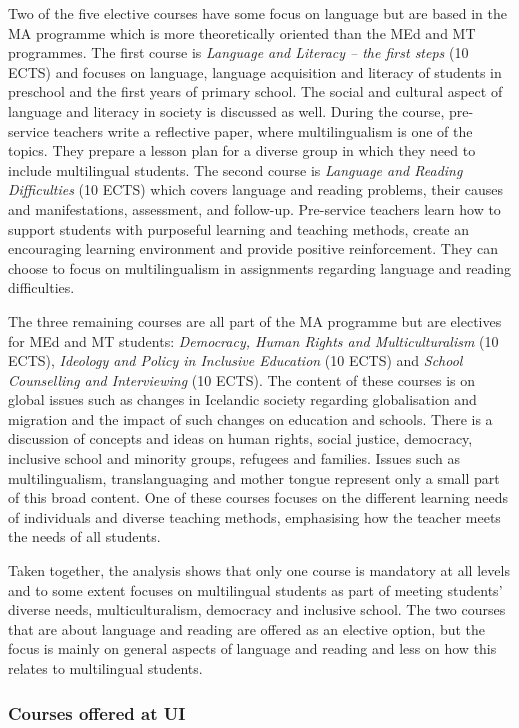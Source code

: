 \documentclass[output=paper]{langscibook}
\begin{document}
Two of the five elective courses have some focus on language but are based in the MA programme which is more theoretically oriented than the MEd and MT programmes. The first course is \textit{Language and Literacy – the first steps} (10 ECTS) and focuses on language, language acquisition and literacy of students in preschool and the first years of primary school. The social and cultural aspect of language and literacy in society is discussed as well. During the course, pre-service teachers write a reflective paper, where multilingualism is one of the topics. They prepare a lesson plan for a diverse group in which they need to include multilingual students. The second course is \textit{Language and Reading Difficulties} (10 ECTS) which covers language and reading problems, their causes and manifestations, assessment, and follow-up. Pre-service teachers learn how to support students with purposeful learning and teaching methods, create an encouraging learning environment and provide positive reinforcement. They can choose to focus on multilingualism in assignments regarding language and reading difficulties.

The three remaining courses are all part of the MA programme but are electives for MEd and MT students: \textit{Democracy, Human Rights and Multiculturalism} (10 ECTS), \textit{Ideology and Policy in Inclusive Education} (10 ECTS) and \textit{School Counselling and Interviewing} (10 ECTS).  The content of these courses is on global issues such as changes in Icelandic society regarding globalisation and migration and the impact of such changes on education and schools. There is a discussion of concepts and ideas on human rights, social justice, democracy, inclusive school and minority groups, refugees and families. Issues such as multilingualism, translanguaging and mother tongue represent only a small part of this broad content. One of these courses focuses on the different learning needs of individuals and diverse teaching methods, emphasising how the teacher meets the needs of all students.

Taken together, the analysis shows that only one course is mandatory at all levels and to some extent focuses on multilingual students as part of meeting students’ diverse needs, multiculturalism, democracy and inclusive school. The two courses that are about language and reading are offered as an elective option, but the focus is mainly on general aspects of language and reading and less on how this relates to multilingual students.

\subsubsection{Courses offered at UI}\label{sec:gunnþórsdóttir:5.1.2} %
\end{document}

